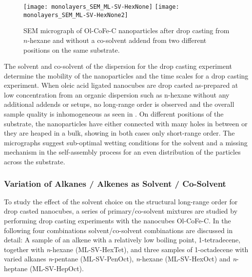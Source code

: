 \documentclass[\main/dresen_thesis.tex]{subfiles}
\begin{document}
  \label{sec:monolayers:preparation:solventProperties}
  \begin{figure}[tb]
    \centering
    \texttt{[image: monolayers\_SEM\_ML-SV-HexNone]}
    \texttt{[image: monolayers\_SEM\_ML-SV-HexNone2]}
    \caption{\label{fig:monolayers:preparation:solventVariation:semNoCoSolvent}SEM micrograph of Ol-CoFe-C nanoparticles after drop casting from $\mathit{n}$-hexane and without a co-solvent addend from two different positions on the same substrate.}
  \end{figure}
  The solvent and co-solvent of the dispersion for the drop casting experiment determine the mobility of the nanoparticles and the time scales for a drop casting experiment.
  When oleic acid ligated nanocubes are drop casted as-prepared at low concentration from an organic dispersion such as n-hexane without any additional addends or setups, no long-range order is observed and the overall sample quality is inhomogeneous as seen in .
  On different positions of the substrate, the nanoparticles have either connected with many holes in between or they are heaped in a bulk, showing in both cases only short-range order.
  The micrographs suggest sub-optimal wetting conditions for the solvent and a missing mechanism in the self-assembly process for an even distribution of the particles across the substrate.

  \subsubsection{Variation of Alkanes / Alkenes as Solvent / Co-Solvent}
    To study the effect of the solvent choice on the structural long-range order for drop casted nanocubes, a series of  primary/co-solvent mixtures are studied by performing drop casting experiments with the nanocubes Ol-CoFe-C.
    In the following four combinations solvent/co-solvent combinations are discussed in detail: A sample of an alkene with a relatively low boiling point, 1-tetradecene, together with \textit{n}-hexane (ML-SV-HexTet), and three samples of 1-octadecene with varied alkanes \textit{n}-pentane (ML-SV-PenOct), \textit{n}-hexane (ML-SV-HexOct) and \textit{n}-heptane (ML-SV-HepOct).
\end{document}
